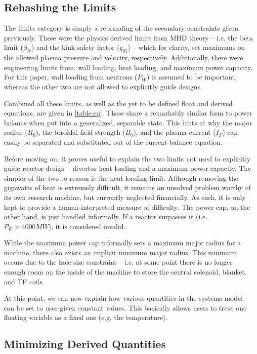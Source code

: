 \subsection{Rehashing the Limits}

The limits category is simply a rebranding of the secondary constraints given previously. These were the physics derived limits from MHD theory -- i.e. the beta limit ($\beta_N$) and the kink safety factor ($q_{95}$) -- which for clarity, set maximums on the allowed plasma pressure and velocity, respectively. Additionally, there were engineering limits from: wall loading, heat loading, and maximum power capacity. For this paper, wall loading from neutrons ($P_W$) is assumed to be important, whereas the other two are not allowed to explicitly guide designs.

Combined all these limits, as well as the yet to be defined float and derived equations, are given in \cref{table:eq}. These share a remarkably similar form to power balance when put into a generalized, separable state. This hints at why the major radius ($R_0$), the toroidal field strength ($B_0$), and the plasma current ($I_P$) can easily be separated and substituted out of the current balance equation.

Before moving on, it proves useful to explain the two limits not used to explicitly guide reactor design -- divertor heat loading and a maximum power capacity. The simpler of the two to reason is the heat loading limit. Although removing the gigawatts of heat is extremely difficult, it remains an unsolved problem worthy of its own research machine, but currently neglected financially. As such, it is only kept to provide a human-interpreted  measure of difficulty. The power cap, on the other hand, is just handled informally. If a reactor surpasses it (i.e. $ P_E > 4000 MW $), it is considered invalid.

While the maximum power cap informally sets a maximum major radius for a machine, there also exists an implicit minimum major radius. This minimum occurs due to the hole-size constraint -- i.e. at some point there is no longer enough room on the inside of the machine to store the central solenoid, blanket, and TF coils.

At this point, we can now explain how various quantities in the systems model can be set to user-given constant values. This basically allows users to treat one floating variable as a fixed one (e.g. the temperature).

\subsection{Minimizing Derived Quantities} 

